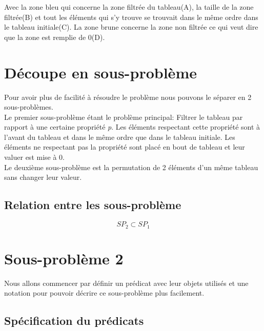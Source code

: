 \documentclass[a4paper, 11pt, oneside]{article}
\begin{document}
    Avec la zone {\color[HTML]{3531FF}bleu} qui concerne la zone filtrée du tableau(A), la taille de la zone filtrée(B) et tout les éléments qui s'y trouve se trouvait dans le même ordre dans le tableau initiale(C). La zone {\color[HTML]{9A0000} brune} concerne la zone non filtrée ce qui veut dire que la zone est remplie de 0(D).

\section{Découpe en sous-problème}

    Pour avoir plus de facilité à résoudre le problème nous pouvons le séparer en 2 sous-problèmes.\\
    Le premier sous-problème étant le problème principal: Filtrer le tableau par rapport à une certaine propriété \textit{p}.
    Les éléments respectant cette propriété sont à l'avant du tableau et dans le même ordre que dans le tableau initiale.
    Les éléments ne respectant pas la propriété sont placé en bout de tableau et leur valuer est mise à 0.\\
    Le deuxième sous-problème est la permutation de 2 éléments d'un même tableau sans changer leur valeur.

    \subsection{Relation entre les sous-problème}

    \[
        SP_2 \subset SP_1
    \]
\section{Sous-problème 2}
    Nous allons commencer par définir un prédicat avec leur objets utilisés et une notation
    pour pouvoir décrire ce sous-problème plus facilement.

    \subsection{Spécification du prédicats}
\end{document}
